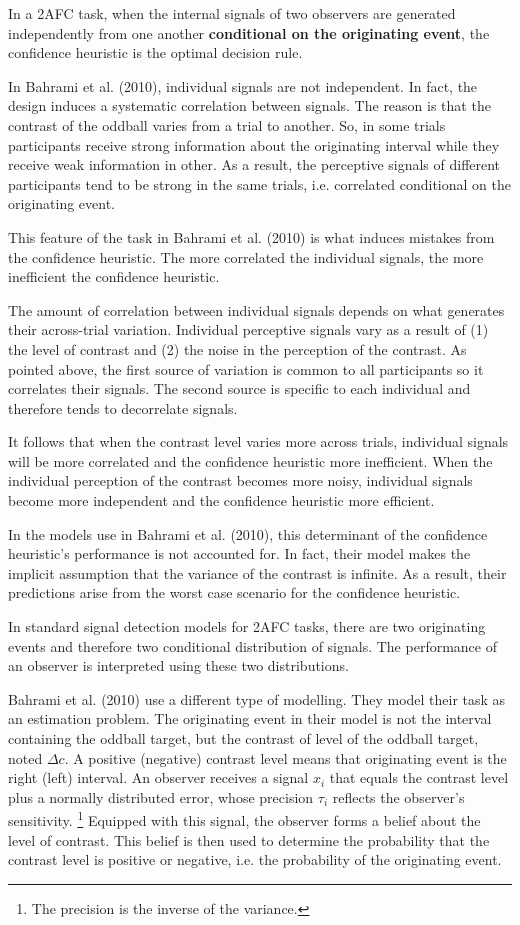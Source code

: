 \documentclass[12pt]{report}
\begin{document}
In a 2AFC task, when the internal signals of two observers are generated independently from one another \textbf{conditional on the originating event}, the confidence heuristic is the optimal decision rule. 

In Bahrami et al. (2010), individual signals are not independent. In fact, the design induces a systematic correlation between signals. The reason is that the contrast of the oddball varies from a trial to another. So, in some trials participants receive strong information about the originating interval while they receive weak information in other. As a result, the perceptive signals of different participants tend to be strong in the same trials, i.e. correlated conditional on the originating event. 

This feature of the task in Bahrami et al. (2010) is what induces mistakes from the confidence heuristic. The more correlated the individual signals, the more inefficient the confidence heuristic. 

The amount of correlation between individual signals depends on what generates their across-trial variation. Individual perceptive signals vary as a result of (1) the level of contrast and (2) the noise in the perception of the contrast. As pointed above, the first source of variation is common to all participants so it correlates their signals. The second source is specific to each individual and therefore tends to decorrelate signals. 

It follows that when the contrast level varies more across trials, individual signals will be more correlated and the confidence heuristic more inefficient. When the individual perception of the contrast becomes more noisy, individual signals become more independent and the confidence heuristic more efficient. 

In the models use in Bahrami et al. (2010), this determinant of the confidence heuristic's performance is not accounted for. In fact, their model makes the implicit assumption that the variance of the contrast is infinite. As a result, their predictions arise from the worst case scenario for the confidence heuristic.

In standard signal detection models for 2AFC tasks, there are two originating events and therefore two conditional distribution of signals. The performance of an observer is interpreted using these two distributions. 


Bahrami et al. (2010) use a different type of modelling. They model their task as an estimation problem. The originating event in their model is not the interval containing the oddball target, but the contrast of level of the oddball target, noted $\Delta c$. A positive (negative) contrast level means that originating event is the right (left) interval. An observer receives a signal $x_i$ that equals the contrast level plus a normally distributed error, whose precision $\tau_i$ reflects the observer's sensitivity. \footnote{The precision is the inverse of the variance.} Equipped with this signal, the observer forms a belief about the level of contrast. This belief is then used to determine the probability that the contrast level is positive or negative, i.e. the probability of the originating event. 
\end{document}
